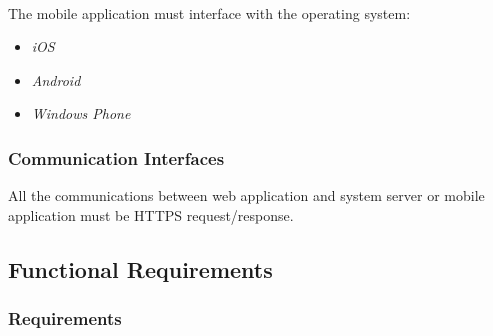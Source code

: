 \documentclass[english]{article}
\begin{document}
\paragraph{}
The mobile application must interface with the operating system:
\begin{itemize}
  \item{\textit{iOS}}
  \item{\textit{Android}}
  \item{\textit{Windows Phone}}
\end{itemize}

\subsubsection{Communication Interfaces}

All the communications between web application and system server or mobile application must be HTTPS request/response.

\newpage

\subsection{Functional Requirements}

\subsubsection{Requirements}
\end{document}
